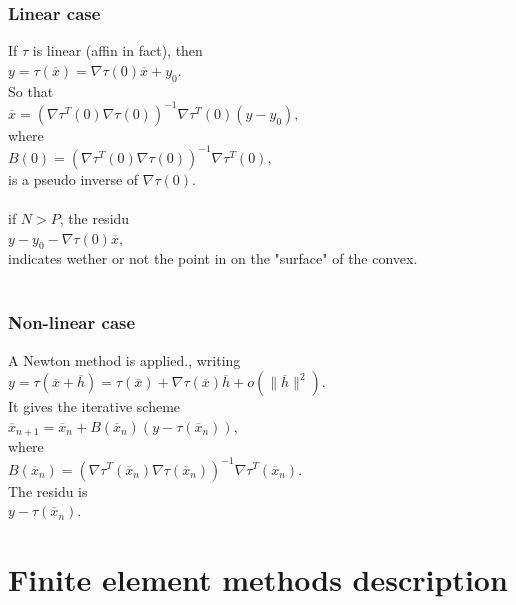 \documentclass[11pt,a4paper]{article}
\begin{document}
\subsubsection*{Linear case}
If $\tau$ is linear (affin in fact), then \\
$y = \tau(\overline{x}) = \nabla \tau(0) \overline{x} + y_0.$ \\
So that \\
$\overline{x} = (\nabla \tau^T(0) \nabla \tau(0))^{-1} \nabla \tau^T(0) 
(y - y_0), $ \\
where \\
$B(0) = (\nabla \tau^T(0) \nabla \tau(0))^{-1} \nabla \tau^T(0), $ \\
is a pseudo inverse of $\nabla \tau(0)$. \\ \\
if $N > P$, the residu \\
$y - y_0 -  \nabla \tau(0) \overline{x}, $ \\
indicates wether or not the point in on the "surface" of the convex. \\ 
\\ \subsubsection*{Non-linear case}
A Newton method is applied., writing \\
$y = \tau(\overline{x}+\overline{h}) = \tau(\overline{x})
+ \nabla \tau(\overline{x})\overline{h} + o(\|\overline{h}\|^2). $ \\
It gives the iterative scheme \\
$ \overline{x}_{n+1} = \overline{x}_{n}
+ B(\overline{x}_{n})(y - \tau(\overline{x}_{n})), $  \\
where \\
$ B(\overline{x}_{n}) = (\nabla \tau^T(\overline{x}_{n})
\nabla \tau(\overline{x}_{n}))^{-1} \nabla \tau^T(\overline{x}_{n}).$ \\
The residu is \\
$ y - \tau(\overline{x}_{n}).$ \\

\section{Finite element methods description}
\end{document}

